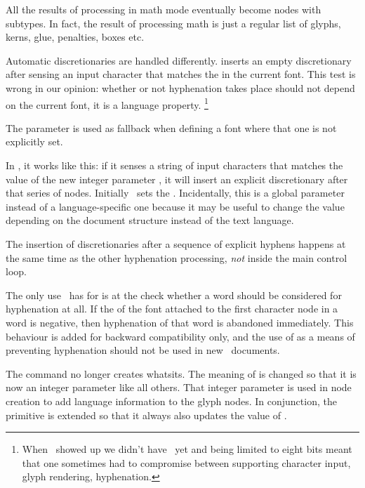 \startitem
    All the results of processing in math mode eventually become nodes with
     subtypes. In fact, the result of processing math is just
    a regular list of glyphs, kerns, glue, penalties, boxes etc.
\stopitem

\startitem
    Automatic discretionaries are handled differently.  inserts an empty
    discretionary after sensing an input character that matches the \type
    {\hyphenchar} in the current font. This test is wrong in our opinion: whether
    or not hyphenation takes place should not depend on the current font, it is a
    language property. \footnote {When \TEX\ showed up we didn't have \UNICODE\
    yet and being limited to eight bits meant that one sometimes had to
    compromise between supporting character input, glyph rendering, hyphenation.}

    The  parameter is used as fallback when defining a
    font where that one is not explicitly set.

    In \LUATEX, it works like this: if it senses a string of input characters
    that matches the value of the new integer parameter \type {\exhyphenchar}, it
    will insert an explicit discretionary after that series of nodes. Initially
    \TEX\ sets the \type {\exhyphenchar=`\-}. Incidentally, this is a global
    parameter instead of a language-specific one because it may be useful to
    change the value depending on the document structure instead of the text
    language.

    The insertion of discretionaries after a sequence of explicit hyphens happens
    at the same time as the other hyphenation processing, {\it not\/} inside the
    main control loop.

    The only use \LUATEX\ has for \type {\hyphenchar} is at the check whether a
    word should be considered for hyphenation at all. If the \type {\hyphenchar}
    of the font attached to the first character node in a word is negative, then
    hyphenation of that word is abandoned immediately. This behaviour is added
    for backward compatibility only, and the use of \type {\hyphenchar=-1} as a
    means of preventing hyphenation should not be used in new \LUATEX\ documents.
\stopitem

\startitem
    The \type {\setlanguage} command no longer creates whatsits. The meaning of
    \type {\setlanguage} is changed so that it is now an integer parameter like all
    others. That integer parameter is used in \type {glyph} node creation to add
    language information to the glyph nodes. In conjunction, the \type {\language}
    primitive is extended so that it always also updates the value of \type
    {\setlanguage}.
\stopitem

